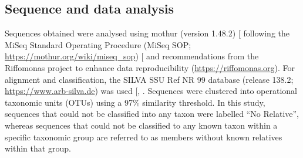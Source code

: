 \documentclass[
  12 pt,
]{article}
\begin{document}
\subsection{Sequence and data analysis}\label{sequence-and-data-analysis}

Sequences obtained were analysed using mothur (version 1.48.2) {[}\citeproc{ref-Schloss2009}{57}{]} following the MiSeq Standard Operating Procedure (MiSeq SOP; \url{https://mothur.org/wiki/miseq_sop}) {[}\citeproc{ref-Kozich2013}{58}{]} and recommendations from the Riffomonas project to enhance data reproducibility (\url{https://riffomonas.org}). For alignment and classification, the SILVA SSU Ref NR 99 database (release 138.2; \url{https://www.arb-silva.de}) was used {[}, \citeproc{ref-Yilmaz2014}{60}{]}. Sequences were clustered into operational taxonomic units (OTUs) using a 97\unit{\percent} similarity threshold. In this study, sequences that could not be classified into any taxon were labelled ``No Relative'', whereas sequences that could not be classified to any known taxon within a specific taxonomic group are referred to as members without known relatives within that group.
\end{document}
